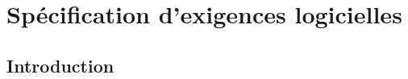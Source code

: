 \chapter{Spécification d'exigences logicielles}

\setcounter{minitocdepth}{1}
\minitoc



\section{Introduction}

